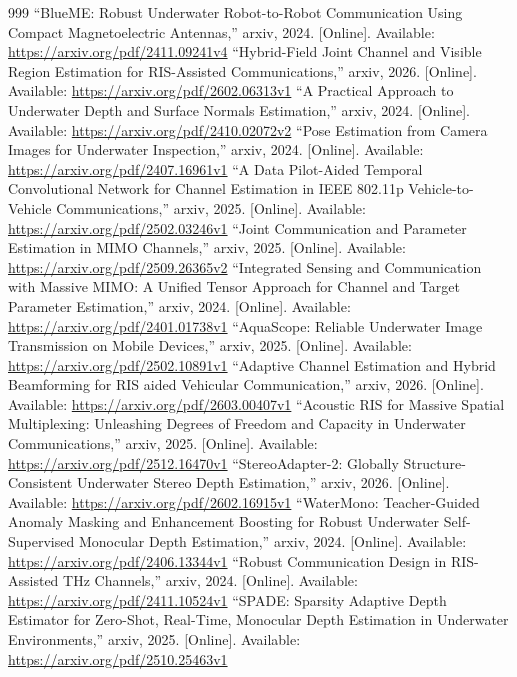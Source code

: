 \documentclass[10pt,journal]{IEEEtran}
\begin{document}
\begin{thebibliography}{999}
 ``BlueME: Robust Underwater Robot-to-Robot Communication Using Compact Magnetoelectric Antennas,'' arxiv, 2024. [Online]. Available: \url{https://arxiv.org/pdf/2411.09241v4}
 ``Hybrid-Field Joint Channel and Visible Region Estimation for RIS-Assisted Communications,'' arxiv, 2026. [Online]. Available: \url{https://arxiv.org/pdf/2602.06313v1}
 ``A Practical Approach to Underwater Depth and Surface Normals Estimation,'' arxiv, 2024. [Online]. Available: \url{https://arxiv.org/pdf/2410.02072v2}
 ``Pose Estimation from Camera Images for Underwater Inspection,'' arxiv, 2024. [Online]. Available: \url{https://arxiv.org/pdf/2407.16961v1}
 ``A Data Pilot-Aided Temporal Convolutional Network for Channel Estimation in IEEE 802.11p Vehicle-to-Vehicle Communications,'' arxiv, 2025. [Online]. Available: \url{https://arxiv.org/pdf/2502.03246v1}
 ``Joint Communication and Parameter Estimation in MIMO Channels,'' arxiv, 2025. [Online]. Available: \url{https://arxiv.org/pdf/2509.26365v2}
 ``Integrated Sensing and Communication with Massive MIMO: A Unified Tensor Approach for Channel and Target Parameter Estimation,'' arxiv, 2024. [Online]. Available: \url{https://arxiv.org/pdf/2401.01738v1}
 ``AquaScope: Reliable Underwater Image Transmission on Mobile Devices,'' arxiv, 2025. [Online]. Available: \url{https://arxiv.org/pdf/2502.10891v1}
 ``Adaptive Channel Estimation and Hybrid Beamforming for RIS aided Vehicular Communication,'' arxiv, 2026. [Online]. Available: \url{https://arxiv.org/pdf/2603.00407v1}
 ``Acoustic RIS for Massive Spatial Multiplexing: Unleashing Degrees of Freedom and Capacity in Underwater Communications,'' arxiv, 2025. [Online]. Available: \url{https://arxiv.org/pdf/2512.16470v1}
 ``StereoAdapter-2: Globally Structure-Consistent Underwater Stereo Depth Estimation,'' arxiv, 2026. [Online]. Available: \url{https://arxiv.org/pdf/2602.16915v1}
 ``WaterMono: Teacher-Guided Anomaly Masking and Enhancement Boosting for Robust Underwater Self-Supervised Monocular Depth Estimation,'' arxiv, 2024. [Online]. Available: \url{https://arxiv.org/pdf/2406.13344v1}
 ``Robust Communication Design in RIS-Assisted THz Channels,'' arxiv, 2024. [Online]. Available: \url{https://arxiv.org/pdf/2411.10524v1}
 ``SPADE: Sparsity Adaptive Depth Estimator for Zero-Shot, Real-Time, Monocular Depth Estimation in Underwater Environments,'' arxiv, 2025. [Online]. Available: \url{https://arxiv.org/pdf/2510.25463v1}

\end{thebibliography}
\end{document}
